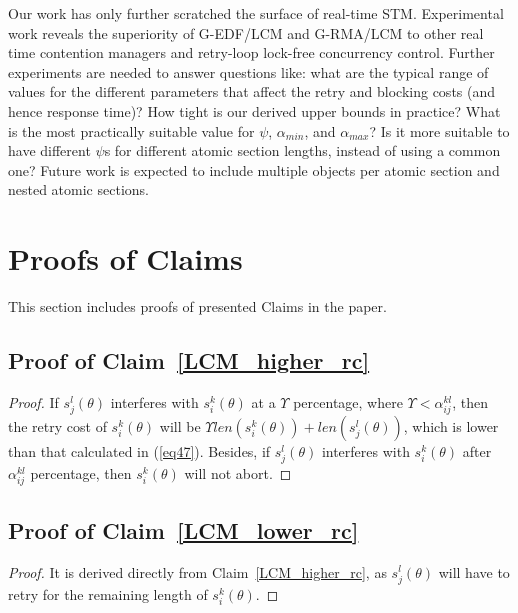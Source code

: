\documentclass[conference]{sig-alternate}
\begin{document}
Our work has only further scratched the surface of real-time STM. Experimental work reveals the superiority of G-EDF/LCM and G-RMA/LCM to other real time contention managers and retry-loop lock-free concurrency control. Further experiments are needed to answer questions like: what are the typical range of values for the different parameters that affect the retry and blocking costs (and hence response time)? How tight is our derived upper bounds in practice? 
What is the most practically suitable
value for $\psi$, $\alpha_{min}$, and $\alpha_{max}$? Is it more suitable to have different $\psi$s for different atomic section lengths, instead of using a common one? Future work is expected to include multiple objects per atomic section and nested atomic sections.


%
%




\appendix
\section{Proofs of Claims}
This section includes proofs of presented Claims in the paper.
\subsection{\label{proof_LCM_higher_rc}Proof of Claim~\ref{LCM_higher_rc}}
\begin{proof}
If $s_{j}^{l}(\theta)$ interferes with $s_{i}^{k}(\theta)$
at a $\Upsilon$ percentage, where $\Upsilon<\alpha_{ij}^{kl}$,
then the retry cost of $s_{i}^{k}(\theta)$ will be $\Upsilon len(s_{i}^{k}(\theta))+len(s_{j}^{l}(\theta))$, which is lower than that calculated in (\ref{eq47}). Besides, 
if $s_{j}^{l}(\theta)$ interferes with $s_{i}^{k}(\theta)$ after
$\alpha_{ij}^{kl}$ percentage, then $s_{i}^{k}(\theta)$ will not
abort.
\end{proof}
\subsection{\label{proof_LCM_lower_rc} Proof of Claim~\ref{LCM_lower_rc}}
\begin{proof}
It is derived directly from Claim~\ref{LCM_higher_rc}, as $s_j^l(\theta)$ will have to retry for the remaining length of $s_i^k(\theta)$.
\end{proof}
\end{document}
